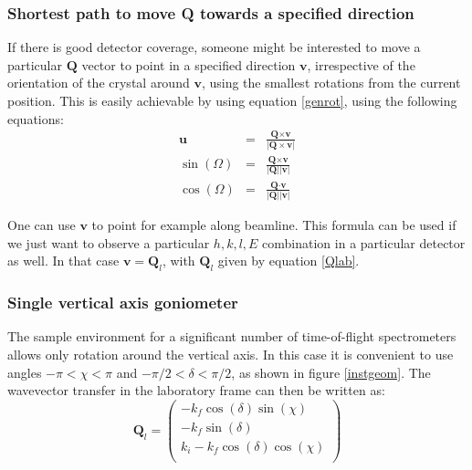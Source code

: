 \documentclass[prb]{revtex4}%
\begin{document}
\subsubsection{Shortest path to move \textbf{Q} towards a specified direction}

If there is good detector coverage, someone might be interested to move a particular $\textbf{Q}$
vector to point in a specified direction $\textbf{v}$, irrespective of the orientation of
the crystal around $\textbf{v}$, using the smallest rotations from the current position.
This is easily achievable by using equation \ref{genrot}, using the following equations:
\begin{eqnarray}
  \textbf{u} &=& \frac{\textbf{Q}\times\textbf{v}}{|\textbf{Q}\times\textbf{v}|} \\
  \sin(\Omega) &=&  \frac{\textbf{Q}\times\textbf{v}}{|\textbf{Q}| |\textbf{v}|} \\
  \cos(\Omega) &=& \frac{\textbf{Q}\cdot\textbf{v}}{|\textbf{Q}| |\textbf{v}|}
\end{eqnarray}

One can use $\textbf{v}$ to point for example along beamline. This formula can be used if we just want to
observe a particular $h, k, l, E$ combination in a particular detector as well. In that case $\textbf{v} = \textbf{Q}_l$,
with $\textbf{Q}_l$ given by equation \ref{Qlab}.


\subsubsection{Single vertical axis goniometer}
The sample environment for a significant number of time-of-flight spectrometers allows only rotation around the vertical axis.
In this case it is convenient to use angles $-\pi < \chi < \pi$ and $-\pi/2< \delta < \pi/2$, as shown in figure \ref{instgeom}.
The wavevector transfer in the laboratory frame can then be written as:
\begin{equation}\label{Qlab1}
    \textbf{Q}_l = \left(
                     \begin{array}{c}
                       - k_f \cos(\delta) \sin(\chi) \\
                       - k_f \sin(\delta) \\
                       k_i - k_f \cos(\delta) \cos(\chi) \\
                     \end{array}
                   \right)
\end{equation}
\end{document}
